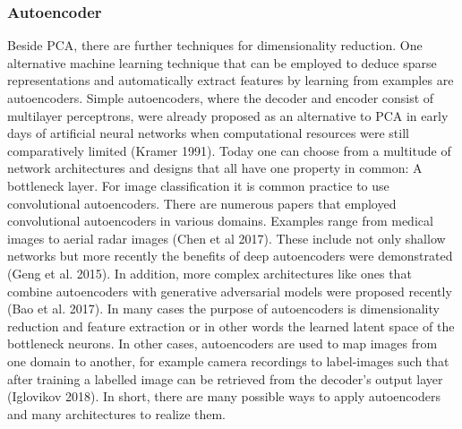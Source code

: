 \subsubsection{Autoencoder}
\label{subsec:Autoencoder}

Beside PCA, there are further techniques for dimensionality reduction. One alternative machine learning technique that can be employed to deduce sparse representations and automatically extract features by learning from examples are autoencoders. Simple autoencoders, where the decoder and encoder consist of multilayer perceptrons, were already proposed as an alternative to PCA in early days of artificial neural networks when computational resources were still comparatively limited (Kramer 1991). Today one can choose from a multitude of network architectures and designs that all have one property in common: A bottleneck layer. For image classification it is common practice to use convolutional autoencoders. There are numerous papers that employed convolutional autoencoders in various domains. Examples range from medical images to aerial radar images (Chen et al 2017). These include not only shallow networks but more recently the benefits of deep autoencoders were demonstrated (Geng et al. 2015). In addition, more complex architectures like ones that combine autoencoders with generative adversarial models were proposed recently (Bao et al. 2017). In many cases the purpose of autoencoders is dimensionality reduction and feature extraction or in other words the learned latent space of the bottleneck neurons. In other cases, autoencoders are used to map images from one domain to another, for example camera recordings to label-images such that after training a labelled image can be retrieved from the decoder’s output layer (Iglovikov 2018). In short, there are many possible ways to apply autoencoders and many architectures to realize them. \\
\\
